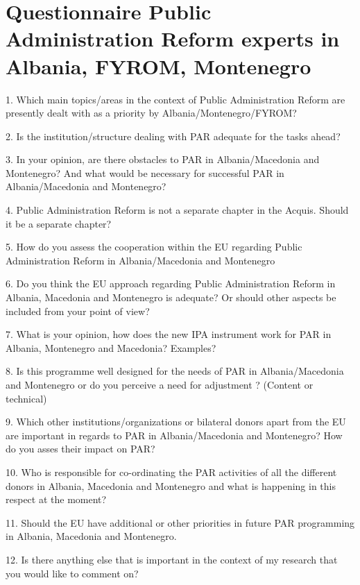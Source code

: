 \chapter{Questionnaire Public Administration Reform experts in Albania, FYROM, Montenegro}
\label{Questionnaire Public Administration Reform experts}
1. Which main topics/areas in the context of Public Administration Reform are presently dealt with as a priority by Albania/Montenegro/FYROM?

2. Is the institution/structure dealing with PAR adequate for the tasks ahead? 

3. In your opinion, are there obstacles to PAR in Albania/Macedonia and Montenegro? And what would be necessary for successful PAR in Albania/Macedonia and Montenegro? 

4. Public Administration Reform is not a separate chapter in the Acquis. Should it be a separate chapter? 

5. How do you assess the cooperation within the EU regarding Public Administration Reform in Albania/Macedonia and Montenegro 

6. Do you think the EU approach regarding Public Administration Reform in Albania, Macedonia and Montenegro is adequate? Or should other aspects be included from your point of view?

7. What is your opinion, how does the new IPA instrument work for PAR in Albania, Montenegro and Macedonia? Examples?

8. Is this programme well designed for the needs of PAR in Albania/Macedonia and Montenegro or do you perceive a need for adjustment ? (Content or technical)

9. Which other institutions/organizations or bilateral donors apart from the EU are important in regards to PAR in Albania/Macedonia and Montenegro? How do you asses their impact on PAR? 

10. Who is responsible for co-ordinating the PAR activities of all the different donors in Albania, Macedonia and Montenegro and what is happening in this respect at the moment? 

11. Should the EU have additional or other priorities in future PAR programming in Albania, Macedonia and Montenegro. 

12. Is there anything else that is important in the context of my research that you would like to comment on?